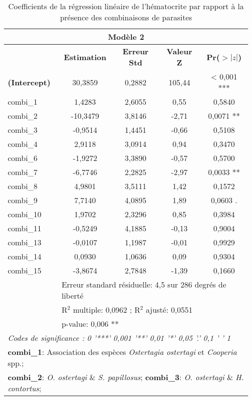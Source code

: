 \begin{table}[!ht]
	\centering
	\caption{Coefficients de la régression linéaire de l'hématocrite par rapport à la présence des combinaisons de parasites}
	\label{tab:model2}
	\begin{tabular}{lcccc}
		\toprule
		\multicolumn{5}{c}{\textbf{Modèle 2}} \\
		\midrule
		& \textbf{Estimation} & \textbf{Erreur Std} & \textbf{Valeur Z} & \textbf{Pr($>|z|$)} \\
		\midrule
		 \textbf{(Intercept)} & 30,3859 & 0,2882 & 105,44 & < 0,001 *** \\
		 combi\_1 & 1,4283 & 2,6055 & 0,55 & 0,5840 \\
		 combi\_2 & -10,3479 & 3,8146 & -2,71 & 0,0071 **\\
		 combi\_3 & -0,9514 & 1,4451 & -0,66 & 0,5108 \\
		 combi\_4 & 2,9118 & 3,0914 & 0,94 & 0,3470 \\
		 combi\_6 & -1,9272 & 3,3890 & -0,57 & 0,5700 \\
		 combi\_7 & -6,7746 & 2,2825 & -2,97 & 0,0033 ** \\
		 combi\_8 & 4,9801 & 3,5111 & 1,42 & 0,1572 \\
		 combi\_9 & 7,7140 & 4,0895 & 1,89 & 0,0603 . \\
		 combi\_10 & 1,9702 & 2,3296 & 0,85 & 0,3984 \\
		 combi\_11 & -0,5249 & 4,1885 & -0,13 & 0,9004 \\
		 combi\_13 & -0,0107 & 1,1987 & -0,01 & 0,9929 \\
		 combi\_14 & 0,0930 & 1,0636 & 0,09 & 0,9304 \\
		 combi\_15 & -3,8674 & 2,7848 & -1,39 & 0,1660 \\
		\midrule
		& \multicolumn{4}{l}{Erreur standard résiduelle: 4,5 sur 286 degrés de liberté}\\
		& \multicolumn{4}{l}{R$^{2}$ multiple: 0,0962 ; R$^{2}$ ajusté: 0,0551}\\
		& \multicolumn{4}{l}{p-value: 0,006 **}\\
		\midrule
		\multicolumn{5}{l}{\textit{Codes de significance : 0 '***' 0,001 '**' 0,01 '*' 0,05 '.' 0,1 ' ' 1}} \\
		\multicolumn{5}{l}{\textbf{combi\_1}: Association des espèces \textit{Ostertagia ostertagi} et \textit{Cooperia} spp.;} \\
		\multicolumn{5}{l}{\textbf{combi\_2}: \textit{O. ostertagi} \& \textit{S. papillosus}; \textbf{combi\_3}: \textit{O. ostertagi} \& \textit{H. contortus};} \\

\end{tabular}
\end{table}
